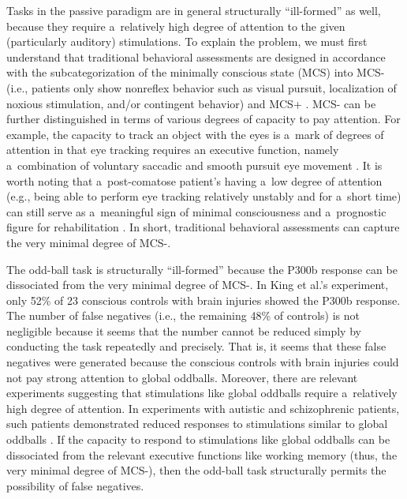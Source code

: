 Tasks in the passive paradigm are in general structurally ``ill-formed'' as well, because they require a~relatively high degree of attention to the given (particularly auditory) stimulations. To explain the problem, we must first understand that traditional behavioral assessments are designed in accordance with the subcategorization of the minimally conscious state (MCS) into MCS- (i.e., patients only show nonreflex behavior such as visual pursuit, localization of noxious stimulation, and/or contingent behavior) and MCS+
\parencite[i.e., patients show command following][p.1087]{bruno_functional_2012}. %
 MCS- can be further distinguished in terms of various degrees of capacity to pay attention. For example, the capacity to track an object with the eyes is a~mark of degrees of attention in that eye tracking requires an executive function, namely a~combination of voluntary saccadic and smooth pursuit eye movement 
\parencite[][]{ansell_visual_1995}. %
 It is worth noting that a~post-comatose patient's having a~low degree of attention (e.g., being able to perform eye tracking relatively unstably and for a~short time) can still serve as a~meaningful sign of minimal consciousness and a~prognostic figure for rehabilitation 
\parencite[][]{ansell_slow--recover_1993}. %
 In short, traditional behavioral assessments can capture the very minimal degree of MCS-.

The odd-ball task is structurally ``ill-formed'' because the P300b response can be dissociated from the very minimal degree of MCS-. In King et al.'s
\parencite*[][]{lule_probing_2013} %
 experiment, only 52\% of 23 conscious controls with brain injuries showed the P300b response. The number of false negatives (i.e., the remaining 48\% of controls) is not negligible because it seems that the number cannot be reduced simply by conducting the task repeatedly and precisely. That is, it seems that these false negatives were generated because the conscious controls with brain injuries could not pay strong attention to global oddballs. Moreover, there are relevant experiments suggesting that stimulations like global oddballs require a~relatively high degree of attention. In experiments with autistic and schizophrenic patients, such patients demonstrated reduced responses to stimulations similar to global oddballs 
\parencites[][]{novick_electrophysiologic_1980}[][]{kargel_effect_2016}. %
 If the capacity to respond to stimulations like global oddballs can be dissociated from the relevant executive functions like working memory (thus, the very minimal degree of MCS-), then the odd-ball task structurally permits the possibility of false negatives.

